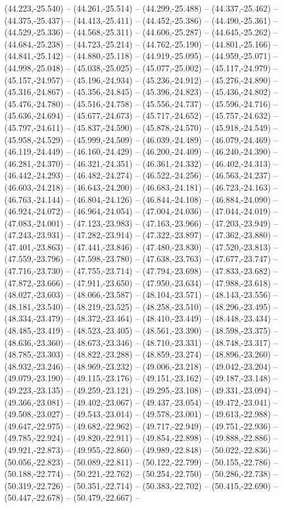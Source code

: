 (44.223,-25.540) -- (44.261,-25.514) -- (44.299,-25.488) -- (44.337,-25.462) -- (44.375,-25.437) -- (44.413,-25.411) -- (44.452,-25.386) -- (44.490,-25.361) -- (44.529,-25.336) -- (44.568,-25.311) -- (44.606,-25.287) -- (44.645,-25.262) -- (44.684,-25.238) -- (44.723,-25.214) -- (44.762,-25.190) -- (44.801,-25.166) -- (44.841,-25.142) -- (44.880,-25.118) -- (44.919,-25.095) -- (44.959,-25.071) -- (44.998,-25.048) -- (45.038,-25.025) -- (45.077,-25.002) -- (45.117,-24.979) -- (45.157,-24.957) -- (45.196,-24.934) -- (45.236,-24.912) -- (45.276,-24.890) -- (45.316,-24.867) -- (45.356,-24.845) -- (45.396,-24.823) -- (45.436,-24.802) -- (45.476,-24.780) -- (45.516,-24.758) -- (45.556,-24.737) -- (45.596,-24.716) -- (45.636,-24.694) -- (45.677,-24.673) -- (45.717,-24.652) -- (45.757,-24.632) -- (45.797,-24.611) -- (45.837,-24.590) -- (45.878,-24.570) -- (45.918,-24.549) -- (45.958,-24.529) -- (45.999,-24.509) -- (46.039,-24.489) -- (46.079,-24.469) -- (46.119,-24.449) -- (46.160,-24.429) -- (46.200,-24.409) -- (46.240,-24.390) -- (46.281,-24.370) -- (46.321,-24.351) -- (46.361,-24.332) -- (46.402,-24.313) -- (46.442,-24.293) -- (46.482,-24.274) -- (46.522,-24.256) -- (46.563,-24.237) -- (46.603,-24.218) -- (46.643,-24.200) -- (46.683,-24.181) -- (46.723,-24.163) -- (46.763,-24.144) -- (46.804,-24.126) -- (46.844,-24.108) -- (46.884,-24.090) -- (46.924,-24.072) -- (46.964,-24.054) -- (47.004,-24.036) -- (47.044,-24.019) -- (47.083,-24.001) -- (47.123,-23.983) -- (47.163,-23.966) -- (47.203,-23.949) -- (47.243,-23.931) -- (47.282,-23.914) -- (47.322,-23.897) -- (47.362,-23.880) -- (47.401,-23.863) -- (47.441,-23.846) -- (47.480,-23.830) -- (47.520,-23.813) -- (47.559,-23.796) -- (47.598,-23.780) -- (47.638,-23.763) -- (47.677,-23.747) -- (47.716,-23.730) -- (47.755,-23.714) -- (47.794,-23.698) -- (47.833,-23.682) -- (47.872,-23.666) -- (47.911,-23.650) -- (47.950,-23.634) -- (47.988,-23.618) -- (48.027,-23.603) -- (48.066,-23.587) -- (48.104,-23.571) -- (48.143,-23.556) -- (48.181,-23.540) -- (48.219,-23.525) -- (48.258,-23.510) -- (48.296,-23.495) -- (48.334,-23.479) -- (48.372,-23.464) -- (48.410,-23.449) -- (48.448,-23.434) -- (48.485,-23.419) -- (48.523,-23.405) -- (48.561,-23.390) -- (48.598,-23.375) -- (48.636,-23.360) -- (48.673,-23.346) -- (48.710,-23.331) -- (48.748,-23.317) -- (48.785,-23.303) -- (48.822,-23.288) -- (48.859,-23.274) -- (48.896,-23.260) -- (48.932,-23.246) -- (48.969,-23.232) -- (49.006,-23.218) -- (49.042,-23.204) -- (49.079,-23.190) -- (49.115,-23.176) -- (49.151,-23.162) -- (49.187,-23.148) -- (49.223,-23.135) -- (49.259,-23.121) -- (49.295,-23.108) -- (49.331,-23.094) -- (49.366,-23.081) -- (49.402,-23.067) -- (49.437,-23.054) -- (49.472,-23.041) -- (49.508,-23.027) -- (49.543,-23.014) -- (49.578,-23.001) -- (49.613,-22.988) -- (49.647,-22.975) -- (49.682,-22.962) -- (49.717,-22.949) -- (49.751,-22.936) -- (49.785,-22.924) -- (49.820,-22.911) -- (49.854,-22.898) -- (49.888,-22.886) -- (49.921,-22.873) -- (49.955,-22.860) -- (49.989,-22.848) -- (50.022,-22.836) -- (50.056,-22.823) -- (50.089,-22.811) -- (50.122,-22.799) -- (50.155,-22.786) -- (50.188,-22.774) -- (50.221,-22.762) -- (50.254,-22.750) -- (50.286,-22.738) -- (50.319,-22.726) -- (50.351,-22.714) -- (50.383,-22.702) -- (50.415,-22.690) -- (50.447,-22.678) -- (50.479,-22.667) -- 